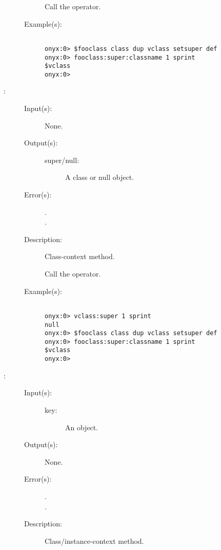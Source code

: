 \begin{description}
\begin{description}
		Call the 
		operator.
	\item[Example(s): ]\begin{verbatim}

onyx:0> $fooclass class dup vclass setsuper def
onyx:0> fooclass:super:classname 1 sprint
$vclass
onyx:0>
		\end{verbatim}
	\end{description}
\label{vclass:super}
\item[{\onyxop{--}{super}{super/null}}: ]
	\begin{description}\item[]
	\item[Input(s): ] None.
	\item[Output(s): ]
		\begin{description}\item[]
		\item[super/null: ]
			A class or null object.
		\end{description}
	\item[Error(s): ]
		\begin{description}\item[]
		\item[.]
		\item[.]
		\end{description}
	\item[Description: ]
		Class-context method.

		Call the 
		operator.
	\item[Example(s): ]\begin{verbatim}

onyx:0> vclass:super 1 sprint
null
onyx:0> $fooclass class dup vclass setsuper def
onyx:0> fooclass:super:classname 1 sprint
$vclass
onyx:0>
		\end{verbatim}
	\end{description}
\label{vclass:undef}
\item[{\onyxop{key}{undef}{--}}: ]
	\begin{description}\item[]
	\item[Input(s): ]
		\begin{description}\item[]
		\item[key: ]
			An object.
		\end{description}
	\item[Output(s): ] None.
	\item[Error(s): ]
		\begin{description}\item[]
		\item[.]
		\item[.]
		\end{description}
	\item[Description: ]
		Class/instance-context method.


\end{description}
\end{description}
